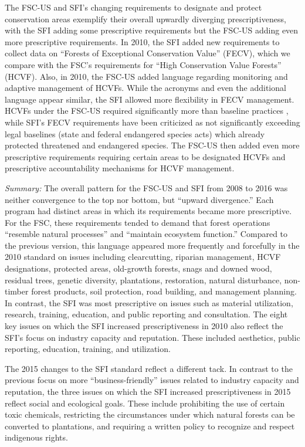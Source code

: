 \documentclass[
      12pt,
            Review ]{article}
\begin{document}
The FSC-US and SFI's changing requirements to designate and protect conservation areas exemplify their overall upwardly diverging prescriptiveness, with the SFI adding some prescriptive requirements but the FSC-US adding even more prescriptive requirements. In 2010, the SFI added new requirements to collect data on ``Forests of Exceptional Conservation Value'' (FECV), which we compare with the FSC's requirements for ``High Conservation Value Forests'' (HCVF). Also, in 2010, the FSC-US added language regarding monitoring and adaptive management of HCVFs. While the acronyms and even the additional language appear similar, the SFI allowed more flexibility in FECV management. HCVFs under the FSC-US required significantly more than baseline practices \citep{Newsom2005}, while SFI's FECV requirements have been criticized as not significantly exceeding legal baselines (state and federal endangered species acts) which already protected threatened and endangered species. The FSC-US then added even more prescriptive requirements requiring certain areas to be designated HCVFs and prescriptive accountability mechanisms for HCVF management.

\emph{Summary:} The overall pattern for the FSC-US and SFI from 2008 to 2016 was neither convergence to the top nor bottom, but ``upward divergence.'' Each program had distinct areas in which its requirements became more prescriptive. For the FSC, these requirements tended to demand that forest operations ``resemble natural processes'' and ``maintain ecosystem function.'' Compared to the previous version, this language appeared more frequently and forcefully in the 2010 standard on issues including clearcutting, riparian management, HCVF designations, protected areas, old-growth forests, snags and downed wood, residual trees, genetic diversity, plantations, restoration, natural disturbance, non-timber forest products, soil protection, road building, and management planning. In contrast, the SFI was most prescriptive on issues such as material utilization, research, training, education, and public reporting and consultation. The eight key issues on which the SFI increased prescriptiveness in 2010 also reflect the SFI's focus on industry capacity and reputation. These included aesthetics, public reporting, education, training, and utilization.

The 2015 changes to the SFI standard reflect a different tack. In contrast to the previous focus on more ``business-friendly'' issues related to industry capacity and reputation, the three issues on which the SFI increased prescriptiveness in 2015 reflect social and ecological goals. These include prohibiting the use of certain toxic chemicals, restricting the circumstances under which natural forests can be converted to plantations, and requiring a written policy to recognize and respect indigenous rights.
\end{document}
